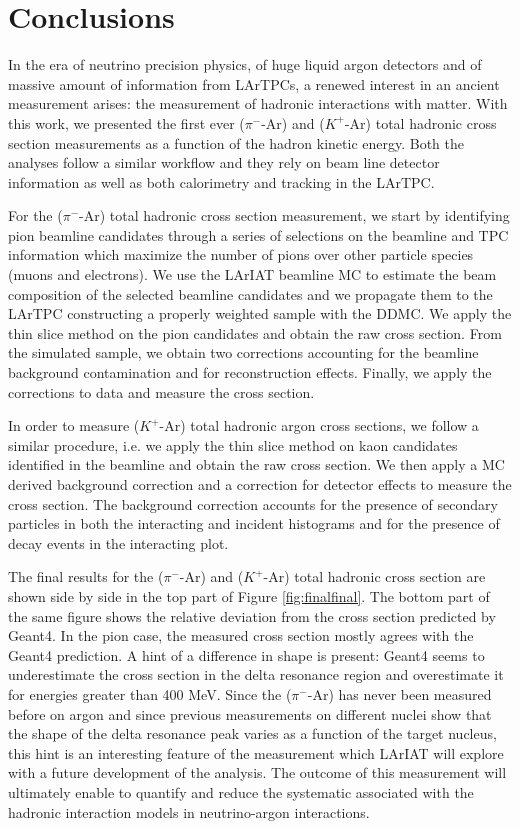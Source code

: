 \chapter{Conclusions}\label{ch:Conclusions}
In the era of neutrino precision physics, of huge liquid argon detectors and of massive amount of information from LArTPCs, a renewed interest in an ancient measurement arises: the measurement of hadronic interactions with matter. With this work, we presented the first ever ($\pi^-$-Ar) and ($K^+$-Ar) total hadronic cross section measurements as a function of the hadron kinetic energy. 
Both the analyses follow a similar workflow and  they rely on beam line detector information as well as both calorimetry and tracking in the LArTPC. 


For the ($\pi^-$-Ar) total hadronic cross section measurement, we start by identifying pion beamline candidates through a series of selections on the beamline and TPC information which maximize the number of pions over other particle species (muons and electrons). We use the LArIAT beamline MC to estimate the beam composition of the selected beamline candidates and we propagate them to the LArTPC constructing a properly weighted sample with the DDMC. We apply the thin slice method on the pion candidates and obtain the raw cross section. From the simulated sample, we obtain two corrections accounting for the beamline background contamination and for reconstruction effects. Finally, we apply the corrections to data and measure the cross section.

In order to measure ($K^+$-Ar) total hadronic  argon cross sections, we follow a similar procedure, i.e. we apply the thin slice method on kaon candidates identified in the beamline and obtain the raw cross section. We then apply a MC derived background correction and a correction for detector effects to measure the cross section. The background correction accounts for the presence of secondary particles in both the interacting and incident histograms and for the presence of decay events in the interacting plot.

The final results for the ($\pi^-$-Ar) and ($K^+$-Ar) total hadronic cross section are shown side by side in the top part of Figure \ref{fig:finalfinal}. The bottom part of the same figure shows the relative deviation from the cross section predicted by Geant4. In the pion case, the measured cross section mostly agrees with the Geant4 prediction. A hint of a difference in shape is present: Geant4 seems to underestimate the cross section in the delta resonance region and overestimate it for energies greater than 400 MeV. Since the   ($\pi^-$-Ar) has never been measured before on argon and since previous measurements on different nuclei show that the shape of the delta resonance peak varies as a function of the target nucleus, this hint is an interesting feature of the measurement which LArIAT will explore with a future development of the analysis. The outcome of this measurement will ultimately enable to quantify and reduce the systematic associated with the hadronic interaction models in neutrino-argon interactions.

